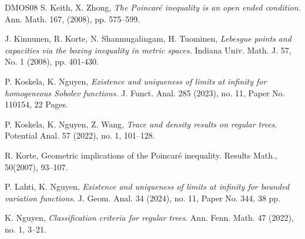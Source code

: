 \documentclass[10pt]{amsart}
\numberwithin{equation}{section}
\begin{document}
\begin{thebibliography}{DMOS08}
  S. Keith, X. Zhong, \emph{The Poincar\'e inequality is an open ended condition.} Ann. Math. 167, (2008), pp. 575–599.

  J. Kinnunen, R. Korte, N. Shanmugalingam, H. Tuominen, \emph{Lebesgue points and capacities via the boxing inequality in metric spaces.} Indiana Univ. Math. J. 57, No. 1 (2008), pp. 401-430.
	
	
 P. Koskela,  K. Nguyen, \emph{Existence and uniqueness of limits at infinity for homogeneous Sobolev functions.} 
J. Funct. Anal. 285 (2023), no. 11, Paper No. 110154, 22 Pages.
	
	 P. Koskela, K. Nguyen, Z. Wang, \emph{Trace and density results on regular trees}. Potential Anal. 57 (2022), no. 1, 101–128.
	
	
	

 R. Korte,   Geometric implications of the Poincaré inequality. Results Math., 50(2007), 93–107.

 P. Lahti, K. Nguyen, \emph{Existence and uniqueness of limits at infinity for bounded variation functions.} J. Geom. Anal. 34 (2024), no. 11, Paper No. 344, 38 pp.
 
	 K. Nguyen, \emph{Classification criteria for regular trees}.  Ann. Fenn. Math. 47 (2022), no. 1, 3–21.
	



\end{thebibliography}
\end{document}
